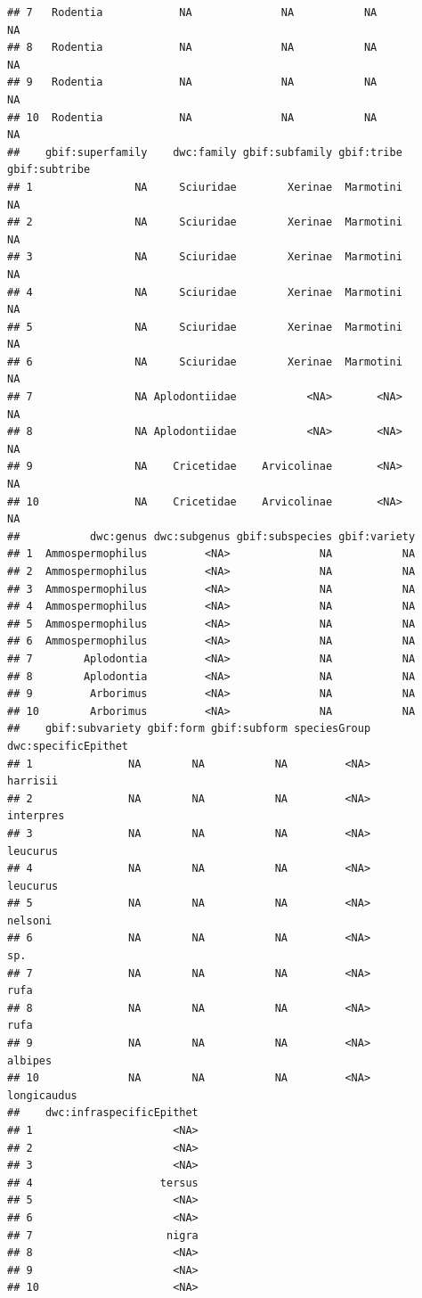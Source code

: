 \documentclass[]{book}
\begin{document}
\begin{verbatim}
## 7   Rodentia            NA              NA           NA              NA
## 8   Rodentia            NA              NA           NA              NA
## 9   Rodentia            NA              NA           NA              NA
## 10  Rodentia            NA              NA           NA              NA
##    gbif:superfamily    dwc:family gbif:subfamily gbif:tribe gbif:subtribe
## 1                NA     Sciuridae        Xerinae  Marmotini            NA
## 2                NA     Sciuridae        Xerinae  Marmotini            NA
## 3                NA     Sciuridae        Xerinae  Marmotini            NA
## 4                NA     Sciuridae        Xerinae  Marmotini            NA
## 5                NA     Sciuridae        Xerinae  Marmotini            NA
## 6                NA     Sciuridae        Xerinae  Marmotini            NA
## 7                NA Aplodontiidae           <NA>       <NA>            NA
## 8                NA Aplodontiidae           <NA>       <NA>            NA
## 9                NA    Cricetidae    Arvicolinae       <NA>            NA
## 10               NA    Cricetidae    Arvicolinae       <NA>            NA
##           dwc:genus dwc:subgenus gbif:subspecies gbif:variety
## 1  Ammospermophilus         <NA>              NA           NA
## 2  Ammospermophilus         <NA>              NA           NA
## 3  Ammospermophilus         <NA>              NA           NA
## 4  Ammospermophilus         <NA>              NA           NA
## 5  Ammospermophilus         <NA>              NA           NA
## 6  Ammospermophilus         <NA>              NA           NA
## 7        Aplodontia         <NA>              NA           NA
## 8        Aplodontia         <NA>              NA           NA
## 9         Arborimus         <NA>              NA           NA
## 10        Arborimus         <NA>              NA           NA
##    gbif:subvariety gbif:form gbif:subform speciesGroup dwc:specificEpithet
## 1               NA        NA           NA         <NA>            harrisii
## 2               NA        NA           NA         <NA>           interpres
## 3               NA        NA           NA         <NA>            leucurus
## 4               NA        NA           NA         <NA>            leucurus
## 5               NA        NA           NA         <NA>             nelsoni
## 6               NA        NA           NA         <NA>                 sp.
## 7               NA        NA           NA         <NA>                rufa
## 8               NA        NA           NA         <NA>                rufa
## 9               NA        NA           NA         <NA>             albipes
## 10              NA        NA           NA         <NA>         longicaudus
##    dwc:infraspecificEpithet
## 1                      <NA>
## 2                      <NA>
## 3                      <NA>
## 4                    tersus
## 5                      <NA>
## 6                      <NA>
## 7                     nigra
## 8                      <NA>
## 9                      <NA>
## 10                     <NA>
\end{verbatim}
\end{document}
